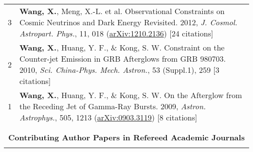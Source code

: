 \documentclass[letterpaper,12pt]{article}
\newcommand{\narrow}{-1.6ex}
\begin{document}
\begin{longtable}{rp{5.8in}}
$$3 &  \textbf{Wang, X.}, Meng, X.-L. et al. Observational Constraints on Cosmic Neutrinos and Dark Energy Revisited. 2012, \textit{J. Cosmol. 
    Astropart. Phys.}, 11, 018 (\href{http://arxiv.org/abs/1210.2136}{arXiv:1210.2136}) [24 citations] \\
2 &  \textbf{Wang, X.}, Huang, Y. F., \& Kong, S. W. Constraint on the Counter-jet Emission in GRB Afterglows from GRB 980703. 2010, \textit{Sci. 
    China-Phys. Mech. Astron.}, 53 (Suppl.1), 259 [3 citations]    \\
1 &  \textbf{Wang, X.}, Huang, Y. F., \& Kong, S. W. On the Afterglow from the Receding Jet of Gamma-Ray Bursts. 2009, \textit{Astron. Astrophys.}, 
    505, 1213 (\href{http://arxiv.org/abs/0903.3119}{arXiv:0903.3119}) [8 citations]   \\
\\[\narrow]
\\[\narrow]
\multicolumn{2}{c}{\textbf{Contributing Author Papers in Refereed Academic Journals}}      \\
\\[\narrow]


\end{longtable}
\end{document}
